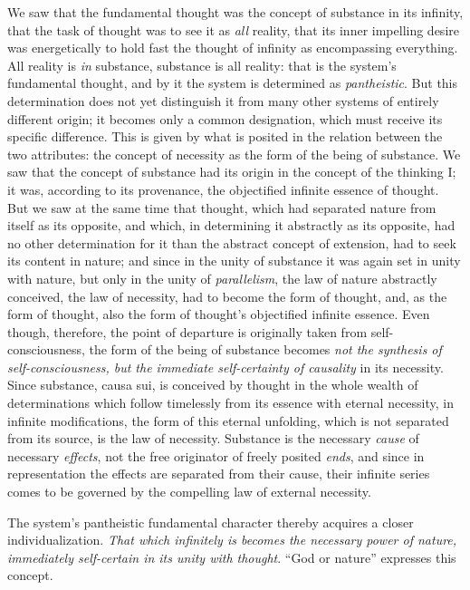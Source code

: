 \documentclass[12pt,a4paper,openany]{book}
\newcommand{\opage}[1]{\marginnote{\footnotesize\textit{[#1]}}}
\begin{document}
We saw that the fundamental thought was the concept of substance in its
infinity, that the task of thought was to see it as \emph{all}
reality, that its inner impelling desire was energetically
to hold fast the thought of infinity as encompassing
everything. All reality is \textit{in} substance, substance is all
reality: that is the system's fundamental thought, and by it
the system is determined as \emph{pantheistic}. But this determination
does not yet distinguish it from many other systems of entirely
different origin; it becomes only a common designation,
which must receive its specific difference. This is given by what is
posited in the relation between the two attributes: the
\opage{172}concept of necessity as the form of the being of substance. We saw that
the concept of substance had its origin in the concept of the
thinking I; it was, according to its provenance, the objectified
infinite essence of thought. But we saw at the same time that thought,
which had separated nature from itself as its opposite,
and which, in determining it abstractly as its opposite,
had no other determination for it than the abstract
concept of extension, had to seek its content in
nature; and since in the unity of substance it was again set in
unity with nature, but only in the unity of \emph{parallelism},
the law of nature abstractly conceived, the law of
necessity, had to become the form of thought, and, as the form of thought,
also the form of thought's objectified infinite essence.
Even though, therefore, the point of departure is originally taken from
self-consciousness, the form of the being of substance becomes
\emph{not the synthesis of self-consciousness, but the immediate
self-certainty of causality} in its necessity. Since substance,
causa sui, is conceived by thought in the whole
wealth of determinations which follow timelessly from its essence with eternal necessity,
in infinite modifications, the
form of this eternal unfolding, which is not separated from its
source, is the law of necessity. Substance is the necessary
\emph{cause} of necessary \emph{effects}, not the free originator of
freely posited \emph{ends}, and since in representation the effects
are separated from their cause, their infinite series comes to be governed
by the compelling law of external necessity.

The system's pantheistic fundamental character thereby acquires
a closer individualization. \emph{That which infinitely is
becomes the necessary power of nature, immediately self-certain
in its unity with thought}. ``God or nature'' expresses
this concept.
\end{document}
